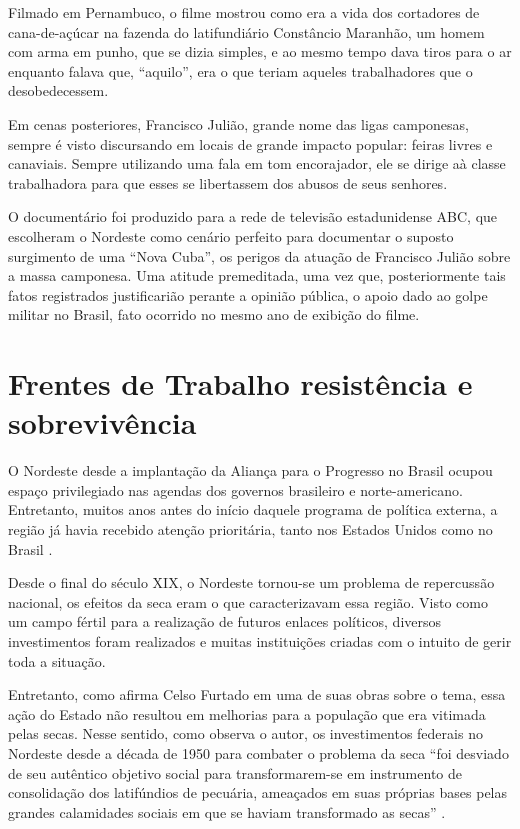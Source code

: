 \begin{refsection}
    Filmado em Pernambuco, o filme mostrou como era a vida dos cortadores de cana-de-açúcar na fazenda do latifundiário Constâncio Maranhão, um homem com arma em punho, que se dizia simples, e ao mesmo tempo dava tiros para o ar enquanto falava que, ``aquilo'', era o que teriam aqueles trabalhadores que o desobedecessem.  

    Em cenas posteriores, Francisco Julião, grande nome das ligas camponesas, sempre é visto discursando em locais de grande impacto popular: feiras livres e canaviais. Sempre utilizando uma fala em tom encorajador, ele se dirige aà classe trabalhadora para que esses se libertassem dos abusos de seus senhores. 

    O documentário foi produzido para a rede de televisão estadunidense ABC, que escolheram o Nordeste como cenário perfeito para documentar o suposto surgimento de uma ``Nova Cuba'', os perigos da atuação de Francisco Julião sobre a massa camponesa. Uma atitude premeditada, uma vez que, posteriormente tais fatos registrados justificarião perante a opinião pública, o apoio dado ao golpe militar no Brasil, fato ocorrido no mesmo ano de exibição do filme. 

    \section{Frentes de Trabalho resistência e sobrevivência}

    O Nordeste desde a implantação da Aliança para o Progresso no Brasil ocupou espaço privilegiado nas agendas dos governos brasileiro e norte-americano. Entretanto, muitos anos antes do início daquele programa de política externa, a região já havia recebido atenção prioritária, tanto nos Estados Unidos como no Brasil \cite[p.~288]{Pereira2005Criar}. 

    Desde o final do século XIX, o Nordeste tornou-se um problema de repercussão nacional, os efeitos da seca eram o que caracterizavam essa região. Visto como um campo fértil para a realização de futuros enlaces políticos, diversos investimentos foram realizados e muitas instituições criadas com o intuito de gerir toda a situação.  

    Entretanto, como afirma Celso Furtado em uma de suas obras sobre o tema, essa ação do Estado não resultou em melhorias para a população que era vitimada pelas secas. Nesse sentido, como observa o autor, os investimentos federais no Nordeste desde a década de 1950 para combater o problema da seca ``foi desviado de seu autêntico objetivo social para transformarem-se em instrumento de consolidação dos latifúndios de pecuária, ameaçados em suas próprias bases pelas grandes calamidades sociais em que se haviam transformado as secas'' \cite[p.~22]{Furtado1985Fantasia}. 


\end{refsection}
